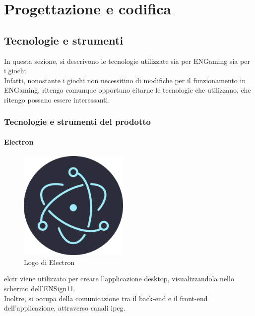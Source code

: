 \chapter{Progettazione e codifica}
\label{cap:progettazione-codifica}

\section{Tecnologie e strumenti}
\label{sec:tecnologie-strumenti}

In questa sezione, si descrivono le tecnologie utilizzate sia per ENGaming sia per i giochi.\\
Infatti, nonostante i giochi non necessitino di modifiche per il funzionamento in ENGaming, ritengo comunque opportuno citarne le tecnologie che utilizzano, che ritengo possano essere interessanti.

\subsection{Tecnologie e strumenti del prodotto}

\subsubsection{Electron}
\begin{figure}[h]
    \centering
    \includegraphics[width=150pt]{images/technologies/electron.png}
    \caption{Logo di Electron}
    \label{fig:electron}
\end{figure}
\gls{elctr} viene utilizzato per creare l'applicazione desktop, visualizzandola nello schermo dell'ENSign11.\\
Inoltre, si occupa della comunicazione tra il back-end e il front-end dell'applicazione, attraverso canali \gls{ipcg}.

